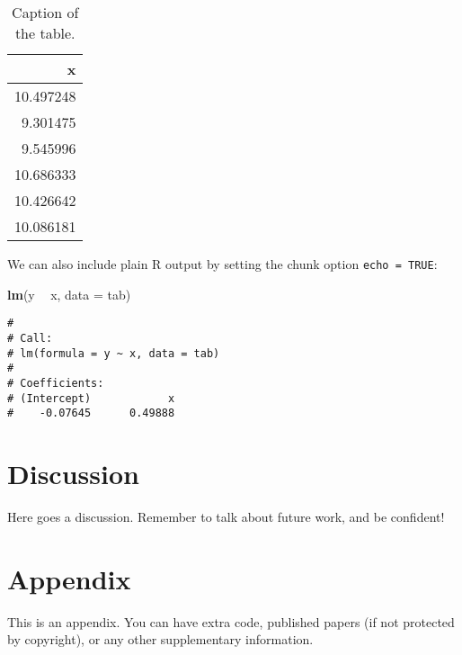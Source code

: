 \documentclass[
  12pt,
  oneside]{book}
\newenvironment{Shaded}{\begin{snugshade}}{\end{snugshade}}
\newcommand{\DataTypeTok}[1]{\textcolor[rgb]{0.13,0.29,0.53}{#1}}
\newcommand{\KeywordTok}[1]{\textcolor[rgb]{0.13,0.29,0.53}{\textbf{#1}}}
\newcommand{\NormalTok}[1]{#1}
\newcommand{\OperatorTok}[1]{\textcolor[rgb]{0.81,0.36,0.00}{\textbf{#1}}}
\newcommand{\StringTok}[1]{\textcolor[rgb]{0.31,0.60,0.02}{#1}}
\begin{document}
\begin{table}

\caption{\label{tab:table}Caption of the table.}
\centering
\begin{tabular}[t]{r}
\toprule
x\\
\midrule
10.497248\\
9.301475\\
9.545996\\
10.686333\\
10.426642\\
10.086181\\
\bottomrule
\end{tabular}
\end{table}

We can also include plain R output by setting the chunk option \texttt{echo\ =\ TRUE}:

\begin{Shaded}
\begin{Highlighting}[]
\KeywordTok{lm}\NormalTok{(y }\OperatorTok{~}\StringTok{ }\NormalTok{x, }\DataTypeTok{data =}\NormalTok{ tab)}
\end{Highlighting}
\end{Shaded}

\begin{verbatim}
# 
# Call:
# lm(formula = y ~ x, data = tab)
# 
# Coefficients:
# (Intercept)            x  
#    -0.07645      0.49888
\end{verbatim}

\hypertarget{discussion}{%
\chapter{Discussion}\label{discussion}}

Here goes a discussion.
Remember to talk about future work, and be confident!

\hypertarget{appendix-appendix}{%
\appendix}


\hypertarget{a-appendix}{%
\chapter{Appendix}\label{a-appendix}}

This is an appendix.
You can have extra code, published papers (if not protected by copyright), or any other supplementary information.

  
\end{document}
